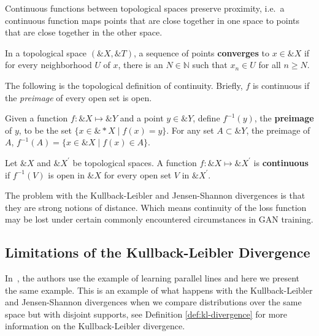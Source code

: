 Continuous functions between topological spaces preserve proximity,
i.e.\ a continuous function maps points that are close together in one
space to points that are close together in the other space.

\begin{definition}%
  \label{def:convergence-topological-space}
  In a topological space $(\&X, \&T)$, a sequence of points
  \textbf{converges} to $x \in \&X$ if for every neighborhood $U$ of
  $x$, there is an $N \in \mathbb{N}$ such that $x_n \in U$ for all
  $n \geq N$.
\end{definition}

The following is the topological definition of continuity. Briefly,
$f$ is continuous if the \textit{preimage} of every open set is open.

\begin{definition}%
  \label{def:pre-image}
  Given a function $f: \&X \mapsto \&Y$ and a point $y \in \&Y$,
  define $f^{-1}(y)$, the \textbf{preimage} of $y$, to be the set
  $\{x \in \&*X \mid f(x) = y\}$.  For any set $A \subset \&Y$, the
  preimage of $A$, $f^{-1}(A) = \{x \in \&X \mid f(x) \in A\}$.
\end{definition}

\begin{definition}%
  \label{def:continuity-topological-space}
  Let $\&X$ and $\&X^\prime$ be topological spaces. A function
  $f: \&X \mapsto \&X^\prime$ is \textbf{continuous} if $f^{-1}(V)$ is
  open in $\&X$ for every open set $V$ in $\&X^\prime$.
\end{definition}

The problem with the Kullback-Leibler and Jensen-Shannon divergences
is that they are strong notions of distance. Which means continuity of
the loss function may be lost under certain commonly encountered
circumstances in GAN training.

\subsection{Limitations of the Kullback-Leibler Divergence}

In~\cite{ref:arjovsky-2017}, the authors use the example of learning
parallel lines and here we present the same example. This is an
example of what happens with the Kullback-Leibler and Jensen-Shannon
divergences when we compare distributions over the same space but with
disjoint supports, see Definition \ref{def:kl-divergence} for more
information on the Kullback-Leibler divergence.

